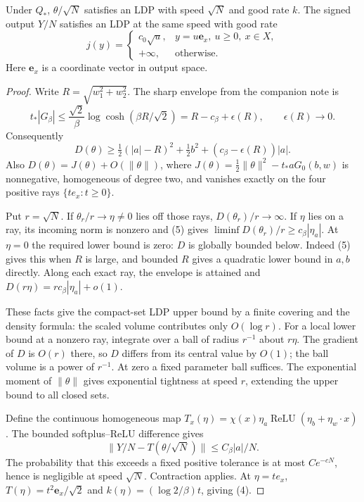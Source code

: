 \documentclass[11pt]{article}
\begin{document}
\begin{lemma}
Under $Q_*$, $\theta/\sqrt N$ satisfies an LDP with speed $\sqrt N$
and good rate $k$. The signed output $Y/N$ satisfies an LDP at the
same speed with good rate
\[
 j(y)=
 \begin{cases}
 c_0\sqrt u,& y=u\mathbf e_x,\ u\ge0,\ x\in X,\\
 +\infty,&\text{otherwise}.
 \end{cases}                                                \tag{4}
\]
Here $\mathbf e_x$ is a coordinate vector in output space.
\end{lemma}
\begin{proof}
Write $R=\sqrt{w_1^2+w_2^2}$. The sharp envelope from the companion
note is
\[
 t_*|G_\beta|\le\frac{\sqrt2}{\beta}\log\cosh(\beta R/\sqrt2)
       =R-c_\beta+\epsilon(R),\qquad \epsilon(R)\to0.
\]
Consequently
\[
 D(\theta)\ge\tfrac12(|a|-R)^2+\tfrac12b^2
                        +(c_\beta-\epsilon(R))|a|.           \tag{5}
\]
Also $D(\theta)=J(\theta)+O(\|\theta\|)$, where
$J(\theta)=\frac12\|\theta\|^2-t_*aG_0(b,w)$ is nonnegative,
homogeneous of degree two, and vanishes exactly on the four positive
rays $\{te_x:t\ge0\}$.

Put $r=\sqrt N$. If $\theta_r/r\to\eta\ne0$ lies off those rays,
$D(\theta_r)/r\to\infty$. If $\eta$ lies on a ray, its incoming norm
is nonzero and (5) gives
$\liminf D(\theta_r)/r\ge c_\beta|\eta_a|$.
At $\eta=0$ the required lower bound is zero: $D$ is globally bounded
below. Indeed (5) gives this when $R$ is large, and bounded $R$ gives
a quadratic lower bound in $a,b$ directly. Along each exact ray,
the envelope is attained and
$D(r\eta)=r c_\beta|\eta_a|+o(1)$.

These facts give the compact-set LDP upper bound by a finite covering
and the density formula: the scaled volume contributes only $O(\log r)$.
For a local lower bound at a nonzero ray, integrate over a ball of
radius $r^{-1}$ about $r\eta$. The gradient of $D$ is $O(r)$ there,
so $D$ differs from its central value by $O(1)$; the ball volume is a
power of $r^{-1}$. At zero a fixed parameter ball suffices.
The exponential moment of $\|\theta\|$ gives exponential tightness
at speed $r$, extending the upper bound to all closed sets.

Define the continuous homogeneous map
$T_x(\eta)=\chi(x)\eta_a\operatorname{ReLU}(\eta_b+\eta_w\cdot x)$.
The bounded softplus--ReLU difference gives
\[
 \|Y/N-T(\theta/\sqrt N)\|\le C_\beta|a|/N.
\]
The probability that this exceeds a fixed positive tolerance is
at most $Ce^{-cN}$, hence is negligible at speed $\sqrt N$.
Contraction applies. At $\eta=t e_x$, $T(\eta)=t^2\mathbf e_x/\sqrt2$
and $k(\eta)=(\log2/\beta)t$, giving (4).
\end{proof}
\end{document}

